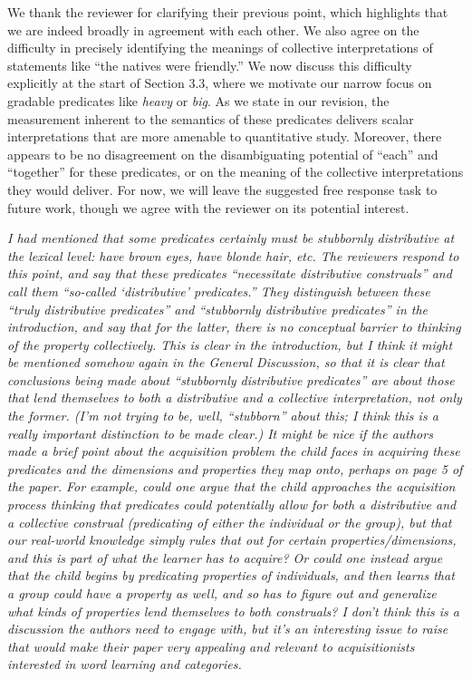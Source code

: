 \documentclass[12pt]{article}
\begin{document}
We thank the reviewer for clarifying their previous point, which highlights that we are indeed broadly in agreement with each other. We also agree on the difficulty in precisely identifying the meanings of collective interpretations of statements like ``the natives were friendly.'' We now discuss this difficulty explicitly at the start of Section 3.3, where we motivate our narrow focus on gradable predicates like \emph{heavy} or \emph{big}. As we state in our revision, the measurement inherent to the semantics of these predicates delivers scalar interpretations that are more amenable to quantitative study. Moreover, there appears to be no disagreement on the disambiguating potential of ``each'' and ``together'' for these predicates, or on the meaning of the collective interpretations they would deliver. For now, we will leave the suggested free response task to future work, though we agree with the reviewer on its potential interest.


\item \emph{I had mentioned that some predicates certainly must be stubbornly distributive at the lexical level: \emph{have brown eyes}, \emph{have blonde hair}, etc. The reviewers respond to this point, and say that these predicates ``necessitate distributive construals'' and call them ``so-called `distributive' predicates.'' They distinguish between these ``truly distributive predicates'' and ``stubbornly distributive predicates'' in the introduction, and say that for the latter, there is no conceptual barrier to thinking of the property collectively. This is clear in the introduction, but I think it might be mentioned somehow again in the General Discussion, so that it is clear that conclusions being made about ``stubbornly distributive predicates'' are about those that lend themselves to both a distributive and a collective interpretation, not only the former. (I'm not trying to be, well, ``stubborn'' about this; I think this is a really important distinction to be made clear.) It might be nice if the authors made a brief point about the acquisition problem the child faces in acquiring these predicates and the dimensions and properties they map onto, perhaps on page 5 of the paper. For example, could one argue that the child approaches the acquisition process thinking that predicates could potentially allow for both a distributive and a collective construal (predicating of either the individual or the group), but that our real-world knowledge simply rules that out for certain properties/dimensions, and this is part of what the learner has to acquire? Or could one instead argue that the child begins by predicating properties of individuals, and then learns that a group could have a property as well, and so has to figure out and generalize what kinds of properties lend themselves to both construals? I don't think this is a discussion the authors need to engage with, but it's an interesting issue to raise that would make their paper very appealing and relevant to acquisitionists interested in word learning and categories.}
\end{document}
